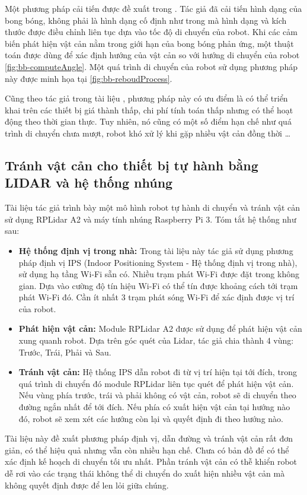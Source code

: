Một phương pháp cải tiến được đề xuất trong \cite{Susnea2010}. Tác giả đã cải tiến hình dạng của bong bóng, không phải là hình dạng cố định như trong \cite{Quinlan1993} mà hình dạng và kích thước được điều chỉnh liên tục dựa vào tốc độ di chuyển của robot. Khi các cảm biến phát hiện vật cản nằm trong giới hạn của bong bóng phản ứng, một thuật toán được dùng để xác định hướng của vật cản so với hướng di chuyển của robot \figurename{ \ref{fig:bb-computeAngle}}. Một quá trình di chuyển của robot sử dụng phương pháp này được minh họa tại \figurename{ \ref{fig:bb-reboudProcess}}.

Cũng theo tác giả trong tài liệu \cite{Susnea2010}, phương pháp này có ưu điểm là có thể triển khai trên các thiết bị giá thành thấp, chi phí tính toán thấp nhưng có thể hoạt động theo thời gian thực. Tuy nhiên, nó cũng có một số điểm hạn chế như quá trình di chuyển chưa mượt, robot khó xử lý khi gặp nhiều vật cản đồng thời \dots

\subsection{Tránh vật cản cho thiết bị tự hành bằng LIDAR và hệ thống nhúng}
  Tài liệu \cite{Baras2019} tác giả trình bày một mô hình robot tự hành di chuyển và tránh vật cản sử dụng RPLidar A2 và máy tính nhúng Raspberry Pi 3. Tóm tắt hệ thống như sau:
  \begin{itemize}
    \item \textbf{Hệ thống định vị trong nhà:} Trong tài liệu này tác giả sử dụng phương pháp định vị IPS (Indoor Positioning System - Hệ thống định vị trong nhà), sử dụng hạ tầng Wi-Fi sẵn có. Nhiều trạm phát Wi-Fi được đặt trong không gian. Dựa vào cường độ tín hiệu Wi-Fi có thể tín được khoảng cách tới trạm phát Wi-Fi đó. Cần ít nhất 3 trạm phát sóng Wi-Fi để xác định được vị trí của robot.
    \item \textbf{Phát hiện vật cản:} Module RPLidar A2 được sử dụng để phát hiện vật cản xung quanh robot. Dựa trên góc quét của Lidar, tác giả chia thành 4 vùng: Trước, Trái, Phải và Sau.
    \item \textbf{Tránh vật cản:} Hệ thống IPS dẫn robot đi từ vị trí hiện tại tới đích, trong quá trình di chuyển đó module RPLidar liên tục quét để phát hiện vật cản. Nếu vùng phía trước, trái và phải không có vật cản, robot sẽ di chuyển theo đường ngắn nhất để tới đích. Nếu phía có xuất hiện vật cản tại hướng nào đó, robot sẽ xem xét các hướng còn lại và quyết định đi theo hướng nào.
  \end{itemize}
  Tài liệu này đề xuất phương pháp định vị, dẫn đường và tránh vật cản rất đơn giản, có thể hiệu quả nhưng vẫn còn nhiều hạn chế. Chưa có bản đồ để có thể xác định kế hoạch di chuyển tối ưu nhất. Phần tránh vật cản có thễ khiển robot dễ rơi vào các trạng thái không thể di chuyển do xuất hiện nhiều vật cản mà không quyết định được để len lỏi giữa chúng.

